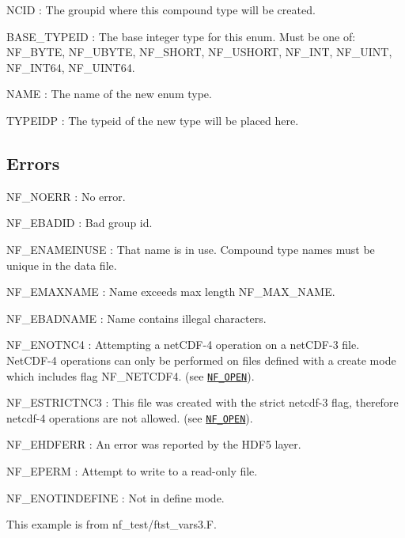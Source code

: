{\ttfamily N\+C\+ID} \+: The groupid where this compound type will be created.

{\ttfamily B\+A\+S\+E\+\_\+\+T\+Y\+P\+E\+ID} \+: The base integer type for this enum. Must be one of\+: N\+F\+\_\+\+B\+Y\+TE, N\+F\+\_\+\+U\+B\+Y\+TE, N\+F\+\_\+\+S\+H\+O\+RT, N\+F\+\_\+\+U\+S\+H\+O\+RT, N\+F\+\_\+\+I\+NT, N\+F\+\_\+\+U\+I\+NT, N\+F\+\_\+\+I\+N\+T64, N\+F\+\_\+\+U\+I\+N\+T64.

{\ttfamily N\+A\+ME} \+: The name of the new enum type.

{\ttfamily T\+Y\+P\+E\+I\+DP} \+: The typeid of the new type will be placed here.

\subsection*{Errors }

{\ttfamily N\+F\+\_\+\+N\+O\+E\+RR} \+: No error.

{\ttfamily N\+F\+\_\+\+E\+B\+A\+D\+ID} \+: Bad group id.

{\ttfamily N\+F\+\_\+\+E\+N\+A\+M\+E\+I\+N\+U\+SE} \+: That name is in use. Compound type names must be unique in the data file.

{\ttfamily N\+F\+\_\+\+E\+M\+A\+X\+N\+A\+ME} \+: Name exceeds max length N\+F\+\_\+\+M\+A\+X\+\_\+\+N\+A\+ME.

{\ttfamily N\+F\+\_\+\+E\+B\+A\+D\+N\+A\+ME} \+: Name contains illegal characters.

{\ttfamily N\+F\+\_\+\+E\+N\+O\+T\+N\+C4} \+: Attempting a net\+C\+D\+F-\/4 operation on a net\+C\+D\+F-\/3 file. Net\+C\+D\+F-\/4 operations can only be performed on files defined with a create mode which includes flag N\+F\+\_\+\+N\+E\+T\+C\+D\+F4. (see \href{#NF_005fOPEN}{\tt N\+F\+\_\+\+O\+P\+EN}).

{\ttfamily N\+F\+\_\+\+E\+S\+T\+R\+I\+C\+T\+N\+C3} \+: This file was created with the strict netcdf-\/3 flag, therefore netcdf-\/4 operations are not allowed. (see \href{#NF_005fOPEN}{\tt N\+F\+\_\+\+O\+P\+EN}).

{\ttfamily N\+F\+\_\+\+E\+H\+D\+F\+E\+RR} \+: An error was reported by the H\+D\+F5 layer.

{\ttfamily N\+F\+\_\+\+E\+P\+E\+RM} \+: Attempt to write to a read-\/only file.

{\ttfamily N\+F\+\_\+\+E\+N\+O\+T\+I\+N\+D\+E\+F\+I\+NE} \+: Not in define mode.

This example is from nf\+\_\+test/ftst\+\_\+vars3.\+F.

